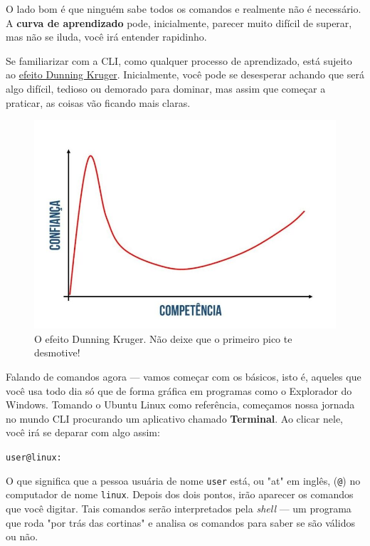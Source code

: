 \documentclass{article}
\begin{document}
	O lado bom é que ninguém sabe todos os comandos e realmente não é necessário. A \textbf{curva de aprendizado} pode, 
	inicialmente, parecer muito difícil de superar, mas não se iluda, você irá entender rapidinho. 

	Se familiarizar com a CLI, como qualquer processo de aprendizado, está sujeito ao \href{https://jornal.usp.br/radio-usp/o-que-e-o-efeito-dunning-kruger/}{efeito Dunning Kruger}. 
	Inicialmente, você pode se desesperar achando que será algo difícil, tedioso ou demorado para dominar, mas assim que
	começar a praticar, as coisas vão ficando mais claras. 

	\begin{figure}[ht!]
  		\centering
		\includegraphics[scale=0.2]{figs/dk.jpeg} 
  		\caption*{O efeito Dunning Kruger. Não deixe que o primeiro pico te desmotive!}
	\end{figure}

	\newpage
	Falando de comandos agora --- vamos começar com os básicos, isto é, aqueles que você usa todo dia só que de forma gráfica
	em programas como o Explorador do Windows. Tomando o Ubuntu Linux como referência, começamos nossa jornada no mundo CLI
	procurando um aplicativo chamado \textbf{Terminal}. Ao clicar nele, você irá se deparar com algo assim: 
	
	\vspace{1ex}
	\texttt{user@linux: ~}
	\vspace{1ex}

	O que significa que a pessoa usuária de nome \texttt{user} está, ou "at" em inglês, (\texttt{@}) no computador de nome
	\texttt{linux}. Depois dos dois pontos, irão aparecer os comandos que você digitar. Tais comandos serão interpretados pela
	\textit{shell} --- um programa que roda "por trás das cortinas" e analisa os comandos para saber se são válidos ou não.
\end{document}
